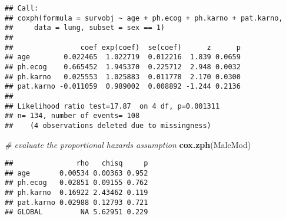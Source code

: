 \documentclass[]{article}
\newenvironment{Shaded}{\begin{snugshade}}{\end{snugshade}}
\newcommand{\KeywordTok}[1]{\textcolor[rgb]{0.13,0.29,0.53}{\textbf{#1}}}
\newcommand{\CommentTok}[1]{\textcolor[rgb]{0.56,0.35,0.01}{\textit{#1}}}
\newcommand{\NormalTok}[1]{#1}
\begin{document}
\begin{verbatim}
## Call:
## coxph(formula = survobj ~ age + ph.ecog + ph.karno + pat.karno, 
##     data = lung, subset = sex == 1)
## 
##                coef exp(coef)  se(coef)      z      p
## age        0.022465  1.022719  0.012216  1.839 0.0659
## ph.ecog    0.665452  1.945370  0.225712  2.948 0.0032
## ph.karno   0.025553  1.025883  0.011778  2.170 0.0300
## pat.karno -0.011059  0.989002  0.008892 -1.244 0.2136
## 
## Likelihood ratio test=17.87  on 4 df, p=0.001311
## n= 134, number of events= 108 
##    (4 observations deleted due to missingness)
\end{verbatim}

\begin{Shaded}
\begin{Highlighting}[]
\CommentTok{# evaluate the proportional hazards assumption}
\KeywordTok{cox.zph}\NormalTok{(MaleMod) }
\end{Highlighting}
\end{Shaded}

\begin{verbatim}
##               rho   chisq     p
## age       0.00534 0.00363 0.952
## ph.ecog   0.02851 0.09155 0.762
## ph.karno  0.16922 2.43462 0.119
## pat.karno 0.02988 0.12793 0.721
## GLOBAL         NA 5.62951 0.229
\end{verbatim}
\end{document}
